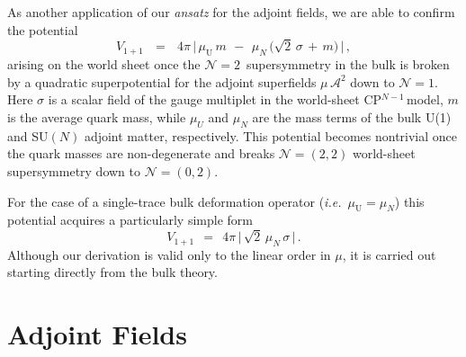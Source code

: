 \documentclass[12pt]{article}
\def\beq{\begin{equation}}
\def\eeq{\end{equation}}
\newcommand{\ntwon}{${\mathcal N}=2$}
\newcommand{\ntwot}{${\mathcal N}= \left(2,2\right) $ }
\newcommand{\ntwoon}{${\mathcal N}= \left(0,2\right)$}
\newcommand{\ca}{{\mathcal A}}
\newcommand{\muU}{\mu_\text{U}}
\newcommand{\cpn}{CP$^{N-1}$\,}
\newcommand{\ie}{{\it i.e.}~}
\newcommand{\ansatz}{{\it ansatz} }
\begin{document}
	As another application of our \ansatz for the adjoint fields, we are able to confirm the potential 
\beq
\label{Vmu}
	V_{1+1}    \:~~ = ~~\:
	4\pi\, \Big|\, \muU\, m  \,~-~\,  \mu_N\, \big( \sqrt{2}\,\sigma \,+\, m \big) \,\Big|\,,
\eeq
	arising on the world sheet \cite{Shifman:2010kr} 
	once the \ntwon\, supersymmetry in the bulk is broken by a quadratic superpotential for the
	adjoint superfields $ \mu\, \ca^2 $ down to ${\mathcal N}=1$.
	Here $\sigma$ is a scalar field of the gauge multiplet in the world-sheet \cpn model, $m$ is the average quark mass,
	while $\mu_U$ and $\mu_N$ are the mass terms of the bulk U(1) and SU$(N)$ adjoint matter, respectively. 
	This potential becomes nontrivial once the quark masses are non-degenerate and breaks \ntwot world-sheet supersymmetry down to 
	\ntwoon. 
	
	For the case of a single-trace bulk deformation operator (\ie $\muU = \mu_N$) this 
	potential acquires a particularly simple form
	\beq
\label{Vmu1}
	V_{1+1}   ~~=~~
	4 \pi\, \Big|\,  \sqrt{2}\, \mu_N\, \sigma  \,\Big|\,.
\eeq
	Although our derivation is valid only to the linear order in $ \mu $, it is carried out
	starting directly from the bulk theory.




\section{Adjoint Fields}
\setcounter{equation}{0}
\end{document}
